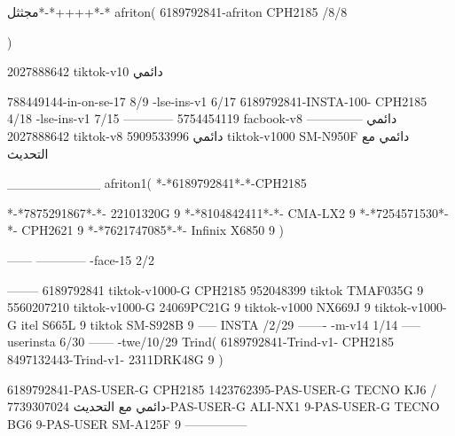 مجثثل*-*++++*-*
afriton(
6189792841-afriton CPH2185  /8/8

)

2027888642 tiktok-v10
دائمي

788449144-in-on-se-17 8/9
-lse-ins-v1 6/17
6189792841-INSTA-100- CPH2185 4/18
-lse-ins-v1 7/15
------------
5754454119 facbook-v8
دائمي
--------------
2027888642 tiktok-v8
دائمي
5909533996 tiktok-v1000  SM-N950F
دائمي مع التحديث

__________
afriton1(
*-*6189792841*-*-CPH2185

*-*7875291867*-*- 22101320G   9\2
*-*8104842411*-*- CMA-LX2   9\4
*-*7254571530*-*- CPH2621   9\6
*-*7621747085*-*- Infinix X6850   9\6
)


------
------------
-face-15 2/2

--------
6189792841 tiktok-v1000-G CPH2185 
952048399 tiktok TMAF035G 9
5560207210 tiktok-v1000-G 24069PC21G  9 tiktok-v1000 NX669J  9 tiktok-v1000-G  itel S665L  9 tiktok  SM-S928B  9\9
-----
 INSTA /2/29
-------
-m-v14 1/14
-----
userinsta 6/30
------
-twe/10/29
Trind(
6189792841-Trind-v1- CPH2185 
8497132443-Trind-v1- 2311DRK48G  9\5
)


6189792841-PAS-USER-G CPH2185 
1423762395-PAS-USER-G TECNO KJ6  /دائمي مع التحديث
7739307024-PAS-USER-G  ALI-NX1  9-PAS-USER-G  TECNO BG6  9-PAS-USER  SM-A125F  9\8
    ---------------
